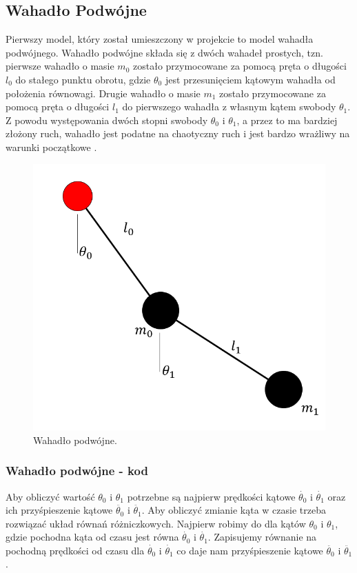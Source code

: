 \documentclass[a4paper,12pt,reqno]{article}
\begin{document}
\subsection{Wahadło Podwójne}

Pierwszy model, który został umieszczony w projekcie to model wahadła podwójnego. Wahadło podwójne składa się z dwóch wahadeł prostych, tzn. pierwsze wahadło o masie $m_0$ zostało przymocowane za pomocą pręta o długości $l_0$ do stałego punktu obrotu, gdzie $\theta_0$ jest przesunięciem kątowym wahadła od położenia równowagi. Drugie wahadło o masie $m_1$ zostało przymocowane za pomocą pręta o długości $l_1$ do pierwszego wahadła z własnym kątem swobody $\theta_1$. Z powodu występowania dwóch stopni swobody $\theta_0$ i $\theta_1$, a przez to ma bardziej złożony ruch, wahadło jest podatne na chaotyczny ruch i jest bardzo wrażliwy na warunki początkowe \cite{double_pendulum_book}.

\begin{figure}[!ht]%
\centering
\includegraphics[width=0.5\columnwidth]{graphics/pendulum/DoublePendulum.png}
\caption{Wahadło podwójne.
\label{BPExample}}%
%
\qquad
\end{figure}  

\subsubsection{Wahadło podwójne - kod}


Aby obliczyć wartość $\theta_0$ i $\theta_1$ potrzebne są najpierw prędkości kątowe  $\dot{\theta_0}$ i $\dot{\theta_1}$ oraz ich przyśpieszenie kątowe $\ddot{\theta_0}$ i $\ddot{\theta_1}$. Aby obliczyć zmianie kąta w czasie trzeba rozwiązać układ równań różniczkowych. Najpierw robimy do dla kątów  $\theta_0$ i $\theta_1$, gdzie pochodna kąta od czasu jest równa $\dot{\theta_0}$ i $\dot{\theta_1}$. Zapisujemy równanie na pochodną prędkości od czasu dla $\dot{\theta_0}$ i $\dot{\theta_1}$ co daje nam przyśpieszenie kątowe $\ddot{\theta_0}$ i $\ddot{\theta_1}$.
\end{document}
